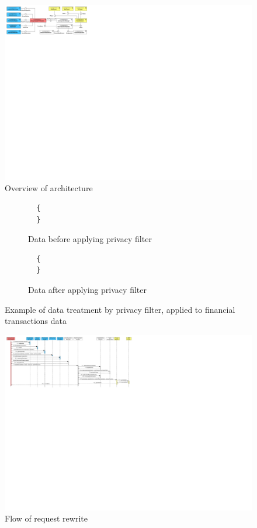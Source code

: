 \begin{figure}[h]
    \centering
    \includegraphics[width=1.0\textwidth]{images/architecture/PePSA-System-Overview.pdf}
    \caption{Overview of \middleware{} architecture}
    \label{fig:arch-overview}
\end{figure}

\begin{figure}[h]
\centering
\begin{subfigure}{.5\textwidth}
  \centering
  \begin{verbatim}
  {
  }
  \end{verbatim}
  \caption{Data before applying privacy filter}
  \label{fig:data-before-privacy-filter}
\end{subfigure}%
\begin{subfigure}{.5\textwidth}
  \centering
  \begin{verbatim}
  {
  }
  \end{verbatim}
  \caption{Data after applying privacy filter}
  \label{fig:data-after-privacy-filter}
\end{subfigure}
\caption{Example of data treatment by privacy filter, applied to financial transactions data}
\label{fig:example-treatment-privacy-filter}
\end{figure}

\begin{figure}
    \centering
    \includegraphics[width=1.0\textwidth]{images/architecture/Rewrite-Flow-PePSA.pdf}
    \caption{Flow of \middleware{} request rewrite}
    \label{fig:pepsa-sequence}
\end{figure}
